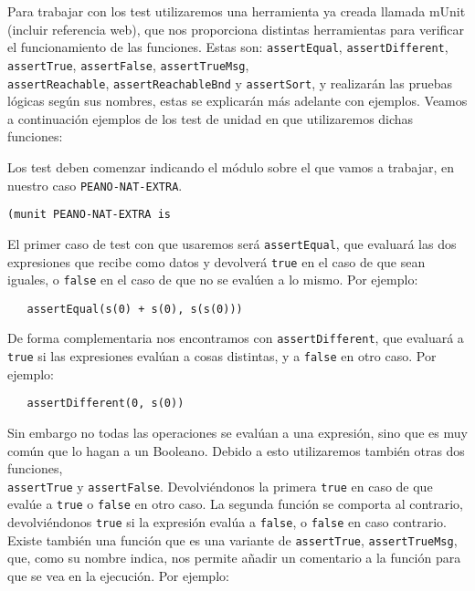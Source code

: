 Para trabajar con los test utilizaremos una herramienta ya creada llamada mUnit (incluir referencia web), que nos proporciona distintas herramientas para verificar el funcionamiento de las funciones. Estas son: \verb"assertEqual", \verb"assertDifferent", \verb"assertTrue", \verb"assertFalse", \verb"assertTrueMsg",\\ \verb"assertReachable", \verb"assertReachableBnd" y \verb"assertSort", y realizarán las pruebas lógicas según sus nombres, estas se explicarán más adelante con ejemplos. Veamos a continuación ejemplos de los test de unidad en que utilizaremos dichas funciones:\par

Los test deben comenzar indicando el módulo sobre el que vamos a trabajar, en nuestro caso \texttt{PEANO-NAT-EXTRA}. \par

{\codesize
\begin{verbatim}
(munit PEANO-NAT-EXTRA is
\end{verbatim}
}

El primer caso de test con que usaremos será \verb"assertEqual", que evaluará las dos expresiones que recibe como datos y devolverá \texttt{true} en el caso de que sean iguales, o \texttt{false} en el caso de que no se evalúen a lo mismo. Por ejemplo: \par

{\codesize
\begin{verbatim}
   assertEqual(s(0) + s(0), s(s(0)))
\end{verbatim}
}

De forma complementaria nos encontramos con \verb"assertDifferent", que evaluará a \texttt{true} si las expresiones evalúan a cosas distintas, y a \texttt{false} en otro caso. Por ejemplo: \par

{\codesize
\begin{verbatim}
   assertDifferent(0, s(0))
\end{verbatim}
}

Sin embargo no todas las operaciones se evalúan a una expresión, sino que es muy común que lo hagan a un Booleano. Debido a esto utilizaremos también otras dos funciones,\\ \verb"assertTrue" y \verb"assertFalse". Devolviéndonos la primera \texttt{true} en caso de que evalúe a \texttt{true} o \texttt{false} en otro caso. La segunda función se comporta al contrario, devolviéndonos \texttt{true} si la expresión evalúa a \texttt{false}, o \texttt{false} en caso contrario. Existe también una función que es una variante de \verb"assertTrue", \verb"assertTrueMsg", que, como su nombre indica, nos permite añadir un comentario a la función para que se vea en la ejecución. Por ejemplo: \par

